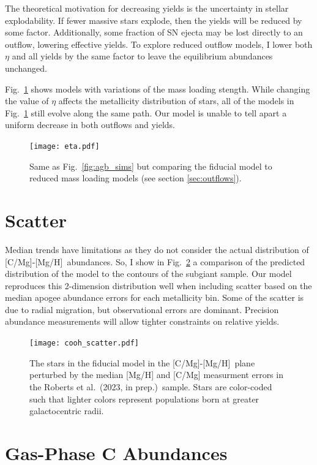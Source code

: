 \documentclass[12pt,oneside,letterpaper]{report}
\newcommand{\apogee}{\gls{apogee}}
\newcommand{\caah}{[C/Mg]-[Mg/H]}
\newcommand{\citetjack}{Roberts et al.~(2023, in prep.)}
\begin{document}
The theoretical motivation for decreasing yields is the uncertainty in stellar explodability.
If fewer massive stars explode, then the yields will be reduced by some factor. Additionally, some fraction of SN ejecta may be lost directly to an outflow, lowering effective yields. To explore reduced outflow models, I lower both $\eta$ and all yields by the same factor to leave the equilibrium abundances unchanged. 

Fig.~\ref{fig:eta} shows models with variations of the mass loading stength. While changing the value of $\eta$ affects the metallicity distribution of stars, all of the models in Fig.~\ref{fig:eta} still evolve along the same path. Our model is unable to tell apart a uniform decrease in both outflows and yields.

\begin{figure}[htp]
    \centering
    \texttt{[image: eta.pdf]}
    \caption[Reduced-outflow models]{Same as Fig.~\ref{fig:agb_sims} but comparing the fiducial model to reduced mass loading models (see section  \ref{sec:outflows}).}
    \label{fig:eta}
\end{figure}


\section{Scatter}

Median trends have limitations as they do not consider the actual distribution of \caah~abundances. So, I show in Fig.~\ref{fig:scatter} a comparison of the predicted distribution of the model to the contours of the \gls{subgiant} sample. Our model reproduces this 2-dimension distribution well when including scatter based on the median \apogee{} abundance errors for each metallicity bin. Some of the scatter is due to radial migration, but observational errors are dominant. Precision abundance measurements will allow tighter constraints on relative yields. 

\begin{figure}[htp]
    \centering
    \texttt{[image: cooh\_scatter.pdf]}
    \caption[Scatter agreement]{The stars in the fiducial model in the \caah~plane perturbed by the median [Mg/H] and [C/Mg] measurment errors in the \citetjack~sample. Stars are color-coded such that lighter colors represent populations born at greater galactocentric radii.
    }
    \label{fig:scatter}
\end{figure}



\section{Gas-Phase C Abundances}\label{sec:gas}
\end{document}
